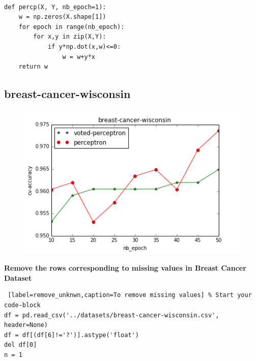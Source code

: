 \documentclass[10pt,a4paper]{article}
\begin{document}
\lstset{language=Python}          %

\begin{lstlisting}[label=percep,caption=Perceptron]  % Start your code-block

def percp(X, Y, nb_epoch=1):
    w = np.zeros(X.shape[1])
    for epoch in range(nb_epoch):
        for x,y in zip(X,Y):
            if y*np.dot(x,w)<=0:
                w = w+y*x
    return w
\end{lstlisting}
\vfill

\subsection{breast-cancer-wisconsin}
\graphicspath{ {/images/} }
\begin{figure}[!h]
\includegraphics[scale=0.75]{images/bcresult.png}	
\end{figure}
\textbf{Remove the rows corresponding to missing values in Breast Cancer Dataset}

\lstset{%
basicstyle=\small, %
identifierstyle=, %
stringstyle=\ttfamily, %
showstringspaces=false} %

\lstset{language=Python}          %

\begin{lstlisting} [label=remove_unknwn,caption=To remove missing values] % Start your code-block
df = pd.read_csv('../datasets/breast-cancer-wisconsin.csv', header=None)
df = df[(df[6]!='?')].astype('float')
del df[0]
n = 1
\end{lstlisting}
\end{document}
